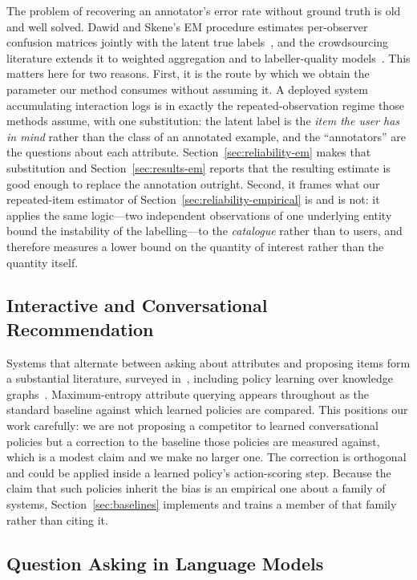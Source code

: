 The problem of recovering an annotator's error rate without ground truth is
old and well solved. Dawid and Skene's EM procedure estimates per-observer
confusion matrices jointly with the latent true labels~\cite{dawid1979}, and
the crowdsourcing literature extends it to weighted aggregation and to
labeller-quality models~\cite{sheng2008,whitehill2009}. This matters here for
two reasons. First, it is the route by which we obtain the parameter our method
consumes without assuming it. A deployed system accumulating interaction logs is
in exactly the repeated-observation regime those methods assume, with one
substitution: the latent label is the \emph{item the user has in mind} rather
than the class of an annotated example, and the ``annotators'' are the questions
about each attribute. Section~\ref{sec:reliability-em} makes that substitution
and Section~\ref{sec:results-em} reports that the resulting estimate is good
enough to replace the annotation outright. Second, it frames what our
repeated-item estimator of
Section~\ref{sec:reliability-empirical} is and is not: it applies the same
logic---two independent observations of one underlying entity bound the
instability of the labelling---to the \emph{catalogue} rather than to users,
and therefore measures a lower bound on the quantity of interest rather than
the quantity itself.

\subsection{Interactive and Conversational Recommendation}

Systems that alternate between asking about attributes and proposing items
form a substantial literature, surveyed
in~\cite{gao2021advances,jannach2021survey}, including policy learning over
knowledge graphs~\cite{lei2020ear,lei2020cpr,deng2021unicorn}.
Maximum-entropy attribute querying appears throughout as the standard baseline
against which learned policies are compared. This positions our work
carefully: we are not proposing a competitor to learned conversational
policies but a correction to the baseline those policies are measured against,
which is a modest claim and we make no larger one. The correction is
orthogonal and could be applied inside a learned policy's action-scoring step.
Because the claim that such policies inherit the bias is an empirical one
about a family of systems, Section~\ref{sec:baselines} implements and trains a
member of that family rather than citing it.

\subsection{Question Asking in Language Models}


